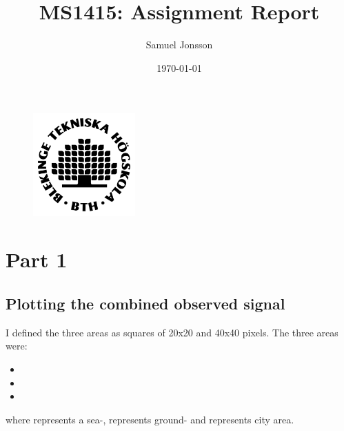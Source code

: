 \documentclass[12pt,a4paper,twoside]{article}
\author{Samuel Jonsson}
\date{\today}
\title{MS1415: Assignment Report}
\begin{document}
\maketitle

\begin{figure}[!b]
    \centering
    \includegraphics[width = 0.35\textwidth]{img/BTH_logo_black.png}
\end{figure}

\newpage

\section{Part 1}
\subsection{Plotting the combined observed signal}
\label{ssec:observedsignal}
I defined the three areas as squares of 20x20 and 40x40 pixels. The three areas were:

\begin{itemize}
    \item {}
    \item {}
    \item {}
\end{itemize}
where  represents a sea-,  represents ground- and  represents city area.
\end{document}
